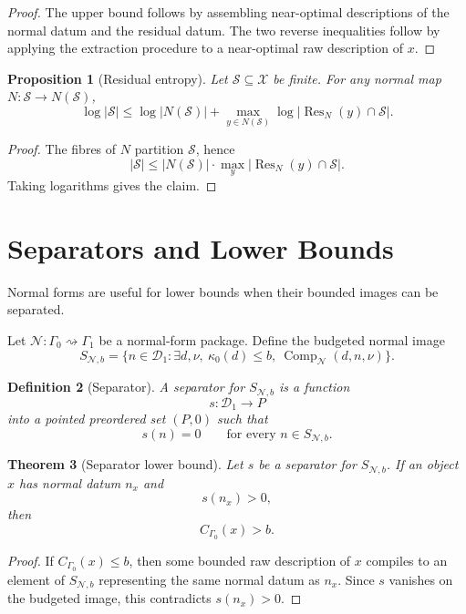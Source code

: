 \documentclass[11pt]{article}
\newtheorem{theorem}{Theorem}[section]
\newtheorem{proposition}[theorem]{Proposition}
\newtheorem{definition}[theorem]{Definition}
\DeclareMathOperator{\Comp}{Comp}
\DeclareMathOperator{\Res}{Res}
\begin{document}
\begin{proof}
The upper bound follows by assembling near-optimal descriptions of the normal datum and the residual datum. The two reverse inequalities follow by applying the extraction procedure to a near-optimal raw description of \(x\).
\end{proof}

\begin{proposition}[Residual entropy]
Let \(\mathcal S\subseteq\mathcal X\) be finite. For any normal map \(N:\mathcal S\to N(\mathcal S)\),
\[
\log|\mathcal S|
\leq
\log|N(\mathcal S)|
+
\max_{y\in N(\mathcal S)}
\log|\Res_N(y)\cap\mathcal S|.
\]
\end{proposition}

\begin{proof}
The fibres of \(N\) partition \(\mathcal S\), hence
\[
|\mathcal S|
\leq
|N(\mathcal S)|\cdot
\max_y|\Res_N(y)\cap\mathcal S|.
\]
Taking logarithms gives the claim.
\end{proof}

\section{Separators and Lower Bounds}

Normal forms are useful for lower bounds when their bounded images can be separated.

Let \(\mathcal N:\Gamma_0\rightsquigarrow\Gamma_1\) be a normal-form package. Define the budgeted normal image
\[
S_{\mathcal N,b}
=
\{n\in\mathcal D_1:
\exists d,\nu,\ \kappa_0(d)\leq b,\ \Comp_{\mathcal N}(d,n,\nu)\}.
\]

\begin{definition}[Separator]
A separator for \(S_{\mathcal N,b}\) is a function
\[
s:\mathcal D_1\to P
\]
into a pointed preordered set \((P,0)\) such that
\[
s(n)=0
\qquad
\text{for every } n\in S_{\mathcal N,b}.
\]
\end{definition}

\begin{theorem}[Separator lower bound]
Let \(s\) be a separator for \(S_{\mathcal N,b}\). If an object \(x\) has normal datum \(n_x\) and
\[
s(n_x)>0,
\]
then
\[
C_{\Gamma_0}(x)>b.
\]
\end{theorem}

\begin{proof}
If \(C_{\Gamma_0}(x)\leq b\), then some bounded raw description of \(x\) compiles to an element of \(S_{\mathcal N,b}\) representing the same normal datum as \(n_x\). Since \(s\) vanishes on the budgeted image, this contradicts \(s(n_x)>0\).
\end{proof}
\end{document}
